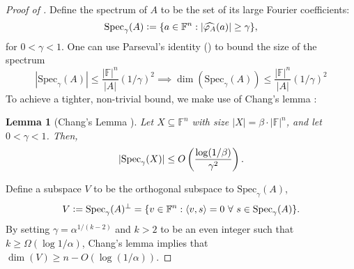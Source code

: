 \documentclass[12pt]{caltech_thesis}
\newcommand{\defeq}{\vcentcolon=}
\def\F{\mathbb{F}}
\newtheorem{lemma}{Lemma}
\begin{document}
\begin{proof}[Proof of ]

Define the spectrum of $A$ to be the set of its large Fourier coefficients:
\begin{equation*}
    \text{Spec}_{\gamma}(A) \defeq \{ a \in \F^n : |\widehat{\varphi_{A}}(a)| \geq \gamma  \},
\end{equation*}
for $0 < \gamma < 1$.
One can use Parseval's identity () to bound the size of the spectrum
\begin{equation*}
    |\text{Spec}_\gamma(A)| \leq \frac{|\F|^n}{|A|}(1/\gamma)^2 \implies \dim (\text{Spec}_\gamma(A)) \leq \frac{|\F|^n}{|A|}(1/\gamma)^2
\end{equation*}
To achieve a tighter, non-trivial bound, we make use of Chang's lemma \cite{Chang2002}:
\begin{lemma}[Chang's Lemma \cite{Chang2002}]
\label{lem:chang}
    Let $X \subseteq \F^n$ with size $|X| = \beta\cdot |\F|^n$, and let $0 < \gamma < 1$. Then,
    \begin{equation}
        |\text{\normalfont{Spec}}_\gamma(X)| \leq O \left(  \frac{\log(1/\beta)}{\gamma^2}\right).
    \end{equation}
\end{lemma}
Define a subspace $V$ to be the orthogonal subspace to $\text{Spec}_\gamma(A)$, 
\begin{equation*}
    V \defeq \text{Spec}_{\gamma}(A)^{\perp} = \{ v \in \F^n : \langle v, s \rangle = 0\ \forall\ s \in \text{Spec}_{\gamma}(A) \}.
\end{equation*}
By setting $\gamma = \alpha^{1/(k-2)}$ and $k>2$ to be an even integer such that $k \geq \Omega(\log 1/\alpha)$, Chang's lemma implies that $\dim(V) \geq n - O(\log(1/\alpha))$.


\end{proof}
\end{document}
